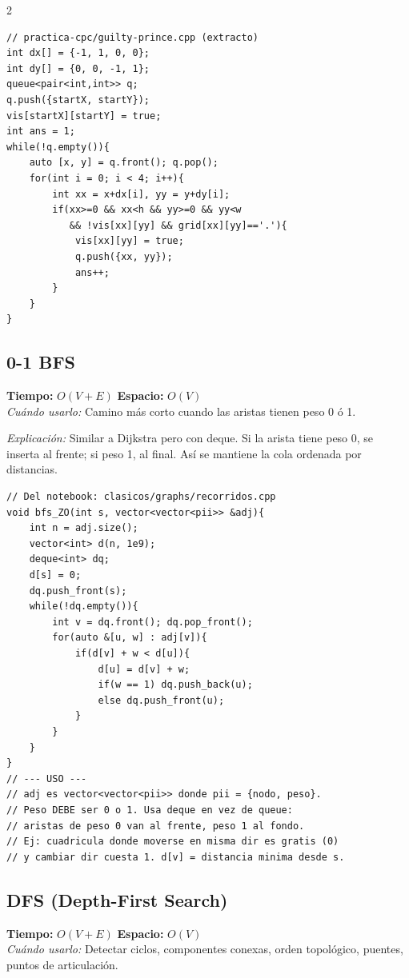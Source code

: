 \documentclass[10pt,a4paper]{article}
\begin{document}
\begin{multicols}{2}
\begin{lstlisting}
// practica-cpc/guilty-prince.cpp (extracto)
int dx[] = {-1, 1, 0, 0};
int dy[] = {0, 0, -1, 1};
queue<pair<int,int>> q;
q.push({startX, startY});
vis[startX][startY] = true;
int ans = 1;
while(!q.empty()){
    auto [x, y] = q.front(); q.pop();
    for(int i = 0; i < 4; i++){
        int xx = x+dx[i], yy = y+dy[i];
        if(xx>=0 && xx<h && yy>=0 && yy<w
           && !vis[xx][yy] && grid[xx][yy]=='.'){
            vis[xx][yy] = true;
            q.push({xx, yy});
            ans++;
        }
    }
}
\end{lstlisting}

\subsection{0-1 BFS}
\textbf{Tiempo:} $O(V + E)$ \quad \textbf{Espacio:} $O(V)$\\
\textit{Cu\'ando usarlo:} Camino m\'as corto cuando las aristas tienen peso 0 \'o 1.

\textit{Explicación:} Similar a Dijkstra pero con deque. Si la arista tiene peso 0, se inserta al frente; si peso 1, al final. Así se mantiene la cola ordenada por distancias.

\begin{lstlisting}
// Del notebook: clasicos/graphs/recorridos.cpp
void bfs_ZO(int s, vector<vector<pii>> &adj){
    int n = adj.size();
    vector<int> d(n, 1e9);
    deque<int> dq;
    d[s] = 0;
    dq.push_front(s);
    while(!dq.empty()){
        int v = dq.front(); dq.pop_front();
        for(auto &[u, w] : adj[v]){
            if(d[v] + w < d[u]){
                d[u] = d[v] + w;
                if(w == 1) dq.push_back(u);
                else dq.push_front(u);
            }
        }
    }
}
// --- USO ---
// adj es vector<vector<pii>> donde pii = {nodo, peso}.
// Peso DEBE ser 0 o 1. Usa deque en vez de queue:
// aristas de peso 0 van al frente, peso 1 al fondo.
// Ej: cuadricula donde moverse en misma dir es gratis (0)
// y cambiar dir cuesta 1. d[v] = distancia minima desde s.
\end{lstlisting}

\subsection{DFS (Depth-First Search)}
\textbf{Tiempo:} $O(V + E)$ \quad \textbf{Espacio:} $O(V)$\\
\textit{Cu\'ando usarlo:} Detectar ciclos, componentes conexas, orden topol\'ogico, puentes, puntos de articulaci\'on.


\end{multicols}
\end{document}
